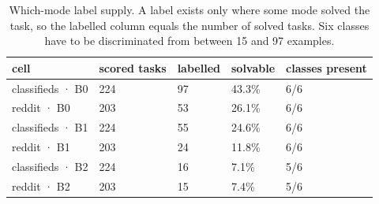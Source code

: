 \begin{table}[tp]
\centering
\caption{Which-mode label supply. A label exists only where some mode solved the task, so the labelled column equals the number of solved tasks. Six classes have to be discriminated from between 15 and 97 examples.}
\label{tab:pb03}
\footnotesize
\setlength{\tabcolsep}{3pt}
\begin{tabular}{@{}lllll@{}}
\toprule
cell & scored tasks & labelled & solvable & classes present \\
\midrule
classifieds · B0 & 224 & 97 & 43.3\% & 6/6 \\
reddit · B0 & 203 & 53 & 26.1\% & 6/6 \\
classifieds · B1 & 224 & 55 & 24.6\% & 6/6 \\
reddit · B1 & 203 & 24 & 11.8\% & 6/6 \\
classifieds · B2 & 224 & 16 & 7.1\% & 5/6 \\
reddit · B2 & 203 & 15 & 7.4\% & 5/6 \\
\bottomrule
\end{tabular}
\end{table}
